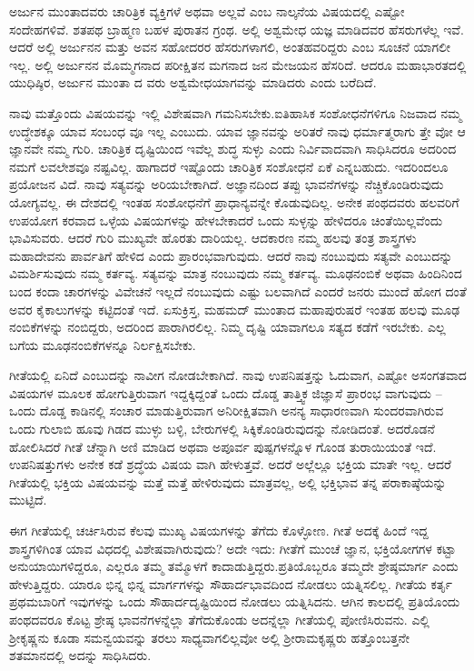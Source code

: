 ಅರ್ಜುನ ಮುಂತಾದವರು ಚಾರಿತ್ರಿಕ ವ್ಯಕ್ತಿಗಳೆ ಅಥವಾ ಅಲ್ಲವೆ ಎಂಬ ನಾಲ್ಕನೆಯ ವಿಷಯದಲ್ಲಿ ಎಷ್ಟೋ ಸಂದೇಹಗಳಿವೆ. ಶತಪಥ ಬ್ರಾಹ್ಮಣ ಬಹಳ ಪುರಾತನ ಗ್ರಂಥ. ಅಲ್ಲಿ ಅಶ್ವಮೇಧ ಯಜ್ಞ ಮಾಡಿದವರ ಹೆಸರುಗಳೆಲ್ಲ ಇವೆ. ಆದರೆ ಅಲ್ಲಿ ಅರ್ಜುನನ ಮತ್ತು ಅವನ ಸಹೋದರರ ಹೆಸರುಗಳಾಗಲಿ, ಅಂತಹವರಿದ್ದರು ಎಂಬ ಸೂಚನೆ ಯಾಗಲೀ ಇಲ್ಲ. ಅಲ್ಲಿ ಅರ್ಜುನನ ಮೊಮ್ಮಗನಾದ ಪರೀಕ್ಷಿತನ ಮಗನಾದ ಜನ ಮೇಜಯನ ಹೆಸರಿದೆ. ಆದರೂ ಮಹಾಭಾರತದಲ್ಲಿ ಯುಧಿಷ್ಠಿರ, ಅರ್ಜುನ ಮುಂತಾ ದ ವರು ಅಶ್ವಮೇಧಯಾಗವನ್ನು ಮಾಡಿದರು ಎಂದು ಬರೆದಿದೆ.

ನಾವು ಮತ್ತೊಂದು ವಿಷಯವನ್ನು ಇಲ್ಲಿ ವಿಶೇಷವಾಗಿ ಗಮನಿಸಬೇಕು.ಐತಿಹಾಸಿಕ ಸಂಶೋಧನೆಗಳಿಗೂ ನಿಜವಾದ ನಮ್ಮ ಉದ್ಧೇಶಕ್ಕೂ ಯಾವ ಸಂಬಂಧ ವೂ ಇಲ್ಲ ಎಂಬುದು. ಯಾವ ಜ್ಞಾನವನ್ನು ಅರಿತರೆ ನಾವು ಧರ್ಮಾತ್ಮರಾಗು ತ್ತೇ ವೋ ಆ ಜ್ಞಾನವೇ ನಮ್ಮ ಗುರಿ. ಚಾರಿತ್ರಿಕ ದೃಷ್ಟಿಯಿಂದ ಇವೆಲ್ಲ ಶುದ್ಧ ಸುಳ್ಳು ಎಂದು ನಿರ್ವಿವಾದವಾಗಿ ಸಾಧಿಸಿದರೂ ಅದರಿಂದ ನಮಗೆ ಲವಲೇಶವೂ ನಷ್ಟವಿಲ್ಲ. ಹಾಗಾದರೆ ಇಷ್ಟೊಂದು ಚಾರಿತ್ರಿಕ ಸಂಶೋಧನೆ ಏಕೆ ಎನ್ನಬಹುದು. ಇದರಿಂದಲೂ ಪ್ರಯೋಜನ ವಿದೆ. ನಾವು ಸತ್ಯವನ್ನು ಅರಿಯಬೇಕಾಗಿದೆ. ಅಜ್ಞಾನದಿಂದ ತಪ್ಪು ಭಾವನೆಗಳನ್ನು ನೆಚ್ಚಿಕೊಂಡಿರುವುದು ಯೋಗ್ಯವಲ್ಲ. ಈ ದೇಶದಲ್ಲಿ ಇಂತಹ ಸಂಶೋಧನೆಗೆ ಪ್ರಾಧಾನ್ಯವನ್ನೇ ಕೊಡುವುದಿಲ್ಲ. ಅನೇಕ ಪಂಥದವರು ಹಲವರಿಗೆ ಉಪಯೋಗ ಕರವಾದ ಒಳ್ಳೆಯ ವಿಷಯಗಳನ್ನು ಹೇಳಬೇಕಾದರೆ ಒಂದು ಸುಳ್ಳನ್ನು ಹೇಳಿದರೂ ಚಿಂತೆಯಿಲ್ಲವೆಂದು ಭಾವಿಸುವರು. ಆದರೆ ಗುರಿ ಮುಖ್ಯವೇ ಹೊರತು ದಾರಿಯಲ್ಲ. ಆದಕಾರಣ ನಮ್ಮ ಹಲವು ತಂತ್ರ ಶಾಸ್ತ್ರಗಳು ಮಹಾದೇವನು ಪಾರ್ವತಿಗೆ ಹೇಳಿದ ಎಂದು ಪ್ರಾರಂಭವಾಗುವುದು. ಆದರೆ ನಾವು ನಂಬುವುದು ಸತ್ಯವೇ ಎಂಬುದನ್ನು ವಿಮರ್ಶಿಸುವುದು ನಮ್ಮ ಕರ್ತವ್ಯ. ಸತ್ಯವನ್ನು ಮಾತ್ರ ನಂಬುವುದು ನಮ್ಮ ಕರ್ತವ್ಯ. ಮೂಢನಂಬಿಕೆ ಅಥವಾ ಹಿಂದಿನಿಂದ ಬಂದ ಕಂದಾ ಚಾರಗಳನ್ನು ವಿವೇಚನೆ ಇಲ್ಲದೆ ನಂಬುವುದು ಎಷ್ಟು ಬಲವಾಗಿದೆ ಎಂದರೆ ಜನರು ಮುಂದೆ ಹೋಗ ದಂತೆ ಅವರ ಕೈಕಾಲುಗಳನ್ನು ಕಟ್ಟಿದಂತೆ ಇದೆ. ಏಸುಕ್ರಿಸ್ತ, ಮಹಮದ್​ ಮುಂತಾದ ಮಹಾಪುರುಷರೆ ಇಂತಹ ಹಲವು ಮೂಢ ನಂಬಿಕೆ\-ಗಳನ್ನು ನಂಬಿದ್ದರು, ಅದರಿಂದ ಪಾರಾಗಿರಲಿಲ್ಲ. ನಿಮ್ಮ ದೃಷ್ಟಿ ಯಾವಾಗಲೂ ಸತ್ಯದ ಕಡೆಗೆ ಇರಬೇಕು. ಎಲ್ಲ ಬಗೆಯ ಮೂಢನಂಬಿಕೆಗಳನ್ನೂ ನಿರ್ಲಕ್ಷಿಸಬೇಕು.

ಗೀತೆಯಲ್ಲಿ ಏನಿದೆ ಎಂಬುದನ್ನು ನಾವೀಗ ನೋಡಬೇಕಾಗಿದೆ. ನಾವು ಉಪನಿಷತ್ತನ್ನು ಓದುವಾಗ, ಎಷ್ಟೋ ಅಸಂಗತವಾದ ವಿಷಯಗಳ ಮೂಲಕ ಹೋಗುತ್ತಿರುವಾಗ ಇದ್ದಕ್ಕಿದ್ದಂತೆ ಒಂದು ದೊಡ್ಡ ತಾತ್ತ್ವಿಕ ಜಿಜ್ಞಾಸೆ ಪ್ರಾರಂಭ ವಾಗುವುದು – ಒಂದು ದೊಡ್ಡ ಕಾಡಿನಲ್ಲಿ ಸಂಚಾರ ಮಾಡುತ್ತಿರುವಾಗ ಅನಿರೀಕ್ಷಿತವಾಗಿ ಅನನ್ಯ ಸಾಧಾರಣವಾಗಿ ಸುಂದರವಾಗಿರುವ ಒಂದು ಗುಲಾಬಿ ಹೂವು ಗಿಡದ ಮುಳ್ಳು ಬಳ್ಳಿ, ಬೇರುಗಳಲ್ಲಿ ಸಿಕ್ಕಿಕೊಂಡಿರುವುದನ್ನು ನೋಡಿದಂತೆ. ಅದರೊಡನೆ ಹೋಲಿಸಿದರೆ ಗೀತೆ ಚೆನ್ನಾಗಿ ಅಣಿ ಮಾಡಿದ ಅಥವಾ ಅಪೂರ್ವ ಪುಷ್ಪಗಳನ್ನೊಳ ಗೊಂಡ ತುರಾಯಿಯಂತೆ ಇದೆ. ಉಪನಿಷತ್ತುಗಳು ಅನೇಕ ಕಡೆ ಶ್ರದ್ಧೆಯ ವಿಷಯ ವಾಗಿ ಹೇಳುತ್ತವೆ. ಅದರೆ ಅಲ್ಲೆಲ್ಲೂ ಭಕ್ತಿಯ ಮಾತೇ ಇಲ್ಲ. ಆದರೆ ಗೀತೆಯಲ್ಲಿ ಭಕ್ತಿಯ ವಿಷಯವನ್ನು ಮತ್ತೆ ಮತ್ತೆ ಹೇಳಿರುವುದು ಮಾತ್ರವಲ್ಲ, ಅಲ್ಲಿ ಭಕ್ತಿಭಾವ ತನ್ನ ಪರಾಕಾಷ್ಠೆಯನ್ನು ಮುಟ್ಟಿದೆ.

ಈಗ ಗೀತೆಯಲ್ಲಿ ಚರ್ಚಿಸಿರುವ ಕೆಲವು ಮುಖ್ಯ ವಿಷಯಗಳನ್ನು ತೆಗೆದು ಕೊಳ್ಳೋಣ. ಗೀತೆ ಅದಕ್ಕೆ ಹಿಂದೆ ಇದ್ದ ಶಾಸ್ತ್ರಗಳಿಗಿಂತ ಯಾವ ವಿಧದಲ್ಲಿ ವಿಶೇಷವಾಗಿರುವುದು? ಅದೇ ಇದು: ಗೀತೆಗೆ ಮುಂಚೆ ಜ್ಞಾನ, ಭಕ್ತಿಯೋಗಗಳ ಕಟ್ಟಾ ಅನುಯಾಯಿಗಳಿದ್ದರೂ, ಎಲ್ಲರೂ ತಮ್ಮ ತಮ್ಮೊಳಗೆ ಕಾದಾಡುತ್ತಿದ್ದರು.ಪ್ರತಿಯೊಬ್ಬರೂ ತಮ್ಮದೇ ಶ್ರೇಷ್ಠಮಾರ್ಗ ಎಂದು ಹೇಳುತ್ತಿದ್ದರು. ಯಾರೂ ಭಿನ್ನ ಭಿನ್ನ ಮಾರ್ಗಗಳನ್ನು ಸೌಹಾರ್ದಭಾವದಿಂದ ನೋಡಲು ಯತ್ನಿಸಲಿಲ್ಲ. ಗೀತೆಯ ಕರ್ತೃ ಪ್ರಥಮಬಾರಿಗೆ ಇವುಗಳನ್ನು ಒಂದು ಸೌಹಾರ್ದದೃಷ್ಟಿಯಿಂದ ನೋಡಲು ಯತ್ನಿಸಿದನು. ಆಗಿನ ಕಾಲದಲ್ಲಿ ಪ್ರತಿಯೊಂದು ಪಂಥದವರೂ ಕೊಟ್ಟ ಶ್ರೇಷ್ಠ ಭಾವನೆಗಳನ್ನೆಲ್ಲಾ ತೆಗೆದುಕೊಂಡು ಅದನ್ನೆಲ್ಲಾ ಗೀತೆಯಲ್ಲಿ ಪೋಣಿಸಿ\-ರುವನು. ಎಲ್ಲಿ ಶ‍್ರೀಕೃಷ್ಣನು ಕೂಡಾ ಸಮನ್ವಯವನ್ನು ತರಲು ಸಾಧ್ಯವಾಗಲಿಲ್ಲವೋ ಅಲ್ಲಿ ಶ‍್ರೀರಾಮಕೃಷ್ಣರು ಹತ್ತೊಂಬತ್ತನೇ ಶತಮಾನದಲ್ಲಿ ಅದನ್ನು ಸಾಧಿಸಿದರು.

